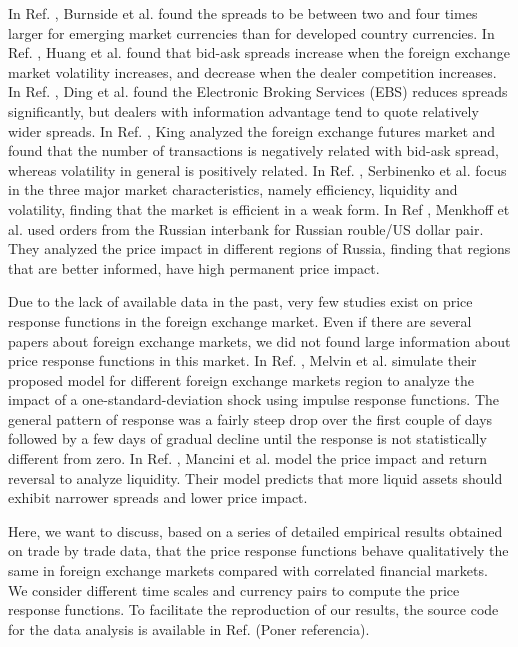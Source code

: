 In Ref. \cite{curr_speculation}, Burnside et al. found the spreads to be
between two and four times larger for emerging market currencies than for
developed country currencies. In Ref. \cite{spread_competition}, Huang et al.
found that bid-ask spreads increase when the foreign exchange market volatility
increases, and decrease when the dealer competition increases. In Ref.
\cite{electronic_forex}, Ding et al. found the Electronic Broking Services
(EBS) reduces spreads significantly, but dealers with information advantage
tend to quote relatively wider spreads. In Ref. \cite{spread_futures}, King
analyzed the foreign exchange futures market and found that the number of
transactions is negatively related with bid-ask spread, whereas volatility in
general is positively related. In Ref. \cite{intraday_forex}, Serbinenko et al.
focus in the three major market characteristics, namely efficiency, liquidity
and volatility, finding that the market is efficient in a weak form. In Ref
\cite{local_forex}, Menkhoff et al. used orders from the Russian interbank for
Russian rouble/US dollar pair. They analyzed the price impact in different
regions of Russia, finding that regions that are better informed, have high
permanent price impact.

Due to the lack of available data in the past, very few studies exist on price
response functions in the foreign exchange market. Even if there are several
papers about foreign exchange markets, we did not found large information about
price response functions in this market. In Ref. \cite{forex_volatility},
Melvin et al. simulate their proposed model for different foreign exchange
markets region to analyze the impact of a one-standard-deviation shock using
impulse response functions. The general pattern of response was a fairly steep
drop over the first couple of days followed by a few days of gradual decline
until the response is not statistically different from zero. In Ref.
\cite{forex_liquidity}, Mancini et al. model the price impact and return
reversal to analyze liquidity. Their model predicts that more liquid assets
should exhibit narrower spreads and lower price impact.

Here, we want to discuss, based on a series of detailed empirical results
obtained on trade by trade data, that the price response functions behave
qualitatively the same in foreign exchange markets compared with correlated
financial markets. We consider different time scales and currency pairs to
compute the price response functions. To facilitate the reproduction of our
results, the source code for the data analysis is available in Ref.
(Poner referencia).

